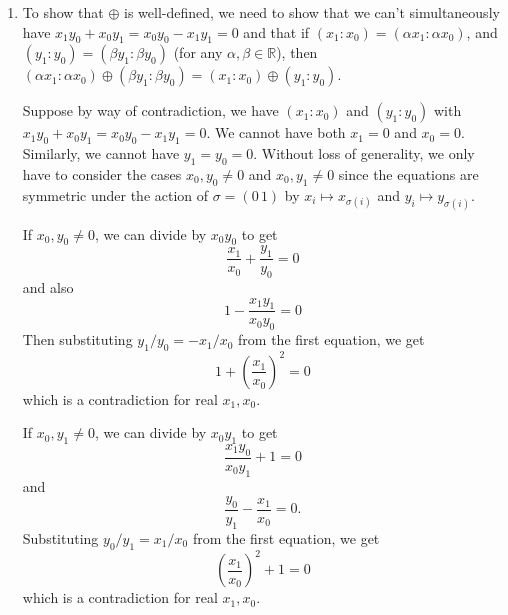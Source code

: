 \documentclass[12 pt, letterpaper]{hmcpset}
\begin{document}
\begin{solution}
	\begin{enumerate}
		\item To show that $\oplus$ is well-defined, we need to show that we can't simultaneously have $x_{1} y_{0} + x_{0} y_{1} = x_{0} y_{0} - x_{1} y_{1} = 0$ and that if $(x_{1} : x_{0}) = (\alpha x_{1} : \alpha x_{0})$, and $(y_{1} : y_{0}) = (\beta y_{1} : \beta y_{0})$ (for any $\alpha, \beta \in \mathbb{R}$), then $(\alpha x_{1} : \alpha x_{0}) \oplus (\beta y_{1} : \beta y_{0}) = (x_{1} : x_{0}) \oplus (y_{1} : y_{0})$.

			Suppose by way of contradiction, we have $(x_{1} : x_{0})$ and $(y_{1} : y_{0})$ with $x_{1} y_{0} + x_{0} y_{1} = x_{0} y_{0} - x_{1} y_{1} = 0$. We cannot have both $x_{1} = 0$ and $x_{0} = 0$. Similarly, we cannot have $y_{1} = y_{0} = 0$. Without loss of generality, we only have to consider the cases $x_{0}, y_{0} \neq 0$ and $x_{0}, y_{1} \neq 0$ since the equations are symmetric under the action of $\sigma = (0 \, 1)$ by $x_{i} \mapsto x_{\sigma(i)}$ and $y_{i} \mapsto y_{\sigma(i)}$.

			If $x_{0}, y_{0} \neq 0$, we can divide by $x_{0} y_{0}$ to get
			\[
				\frac{x_{1}}{x_{0}} + \frac{y_{1}}{y_{0}} = 0
			\]
			and also
			\[
				1 - \frac{x_{1} y_{1}}{x_{0} y_{0}} = 0
			\]
			Then substituting $y_{1}/y_{0} = - x_{1} / x_{0}$ from the first equation, we get
			\[
				1 + \left ( \frac{x_{1}}{x_{0}} \right )^{2} = 0
			\]
			which is a contradiction for real $x_{1}, x_{0}$.

			If $x_{0}, y_{1} \neq 0$, we can divide by $x_{0} y_{1}$ to get
			\[
				\frac{x_{1} y_{0}}{x_{0} y_{1}} + 1 = 0
			\]
			and
			\[
				\frac{y_{0}}{y_{1}} - \frac{x_{1}}{x_{0}} = 0.
			\]
			Substituting $y_{0} / y_{1} = x_{1} / x_{0}$ from the first equation, we get
			\[
				\left ( \frac{x_{1}}{x_{0}} \right )^{2} + 1 = 0
			\]
			which is a contradiction for real $x_{1}, x_{0}$.


\end{enumerate}
\end{solution}
\end{document}
